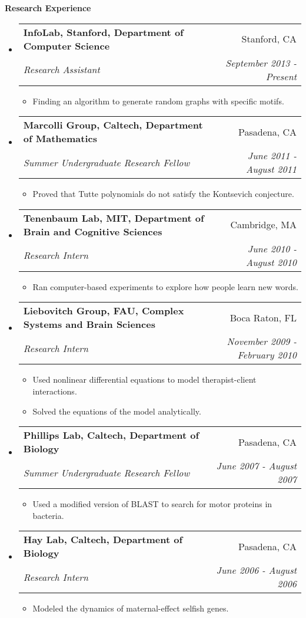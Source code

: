 \documentclass[letterpaper,11pt]{article}
\makeatletter
\newcommand{\resitem}[1]{\item #1 \vspace{-2pt}}
\newcommand{\resheading}[1]{{\large \colorbox{mygrey}{\begin{minipage}{\textwidth}{\textbf{#1 \vphantom{p\^{E}}}}\end{minipage}}}}
\newcommand{\ressubheading}[4]{
\begin{tabular*}{7.0in}{l@{\extracolsep{\fill}}r}
		\textbf{#1} & #2 \\
		\textit{#3} & \textit{#4} \\
\end{tabular*}\vspace{-6pt}}
\makeatother
\begin{document}
\resheading{Research Experience}
\begin{itemize}
\item
	\ressubheading{InfoLab, Stanford, Department of Computer Science}{Stanford, CA}{Research Assistant}{September 2013 - Present}
	\begin{itemize}
		\resitem{Finding an algorithm to generate random graphs with specific motifs.}
	\end{itemize}
\item
	\ressubheading{Marcolli Group, Caltech, Department of Mathematics}{Pasadena, CA}{Summer Undergraduate Research Fellow}{June 2011 - August 2011}
	\begin{itemize}
		\resitem{Proved that Tutte polynomials do not satisfy the Kontsevich conjecture.}
	\end{itemize}
	
\item
	\ressubheading{Tenenbaum Lab, MIT, Department of Brain and Cognitive Sciences}{Cambridge, MA}{Research Intern}{June 2010 - August 2010}
	\begin{itemize}
		\resitem{Ran computer-based experiments to explore how people learn new words.}
	\end{itemize}
	

\item
	\ressubheading{Liebovitch Group, FAU, Complex Systems and Brain Sciences}{Boca Raton, FL}{Research Intern}{November 2009 - February 2010}
	\begin{itemize}
		\resitem{Used nonlinear differential equations to model therapist-client interactions.}
		\resitem{Solved the equations of the model analytically.}
	\end{itemize}


\item
	\ressubheading{Phillips Lab, Caltech, Department of Biology}{Pasadena, CA}{Summer Undergraduate Research Fellow}{June 2007 - August 2007}
	\begin{itemize}
		\resitem{Used a modified version of BLAST to search for motor proteins in bacteria.}
	\end{itemize}

\item
	\ressubheading{Hay Lab, Caltech, Department of Biology}{Pasadena, CA}{Research Intern}{June 2006 - August 2006}
	\begin{itemize}
		\resitem{Modeled the dynamics of maternal-effect selfish genes.}
	\end{itemize}

\end{itemize}
\end{document}
